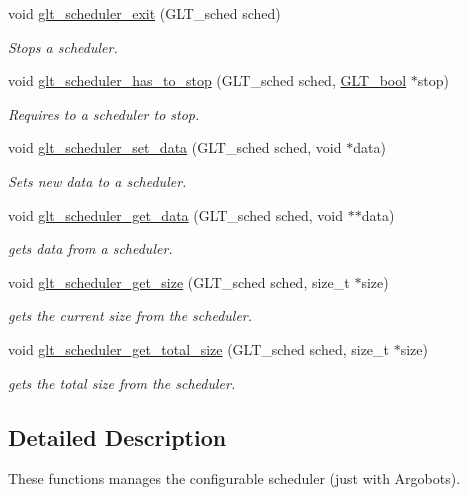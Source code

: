\begin{DoxyCompactItemize}
void \hyperlink{group__SCHED_ga8df21c40ca28bf29f55cb64ecd077aa7}{glt\-\_\-scheduler\-\_\-exit} (G\-L\-T\-\_\-sched sched)
\begin{DoxyCompactList}\small\item\em Stops a scheduler. \end{DoxyCompactList}\item 
void \hyperlink{group__SCHED_ga526550e59b800d931c26248d8369d950}{glt\-\_\-scheduler\-\_\-has\-\_\-to\-\_\-stop} (G\-L\-T\-\_\-sched sched, \hyperlink{group__OBJECTS_ga64121a8c1742a545436e128bcbfd6131}{G\-L\-T\-\_\-bool} $\ast$stop)
\begin{DoxyCompactList}\small\item\em Requires to a scheduler to stop. \end{DoxyCompactList}\item 
void \hyperlink{group__SCHED_ga44dff47dabe465b54837723b50b6da71}{glt\-\_\-scheduler\-\_\-set\-\_\-data} (G\-L\-T\-\_\-sched sched, void $\ast$data)
\begin{DoxyCompactList}\small\item\em Sets new data to a scheduler. \end{DoxyCompactList}\item 
void \hyperlink{group__SCHED_ga1ac411aa00d4a35211ffad154a6cf875}{glt\-\_\-scheduler\-\_\-get\-\_\-data} (G\-L\-T\-\_\-sched sched, void $\ast$$\ast$data)
\begin{DoxyCompactList}\small\item\em gets data from a scheduler. \end{DoxyCompactList}\item 
void \hyperlink{group__SCHED_gabb37915988dae21d910f719f891aea08}{glt\-\_\-scheduler\-\_\-get\-\_\-size} (G\-L\-T\-\_\-sched sched, size\-\_\-t $\ast$size)
\begin{DoxyCompactList}\small\item\em gets the current size from the scheduler. \end{DoxyCompactList}\item 
void \hyperlink{group__SCHED_ga48b98bc3571d3e7374bc5cc85bcf5bc3}{glt\-\_\-scheduler\-\_\-get\-\_\-total\-\_\-size} (G\-L\-T\-\_\-sched sched, size\-\_\-t $\ast$size)
\begin{DoxyCompactList}\small\item\em gets the total size from the scheduler. \end{DoxyCompactList}\end{DoxyCompactItemize}


\subsection{Detailed Description}
These functions manages the configurable scheduler (just with Argobots). 

